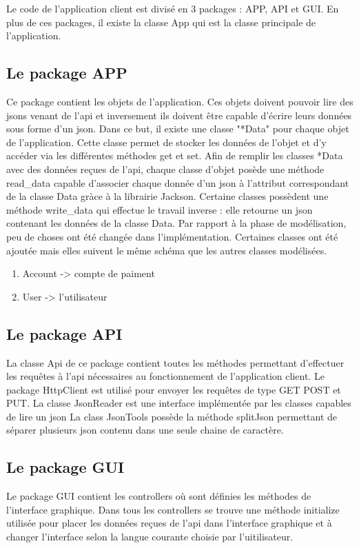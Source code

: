 \documentclass[../rapport.tex]{subfiles}
\begin{document}
Le code de l'application client est divisé en 3 packages : APP, API et GUI.
En plus de ces packages, il existe la classe App qui est la classe principale de l'application. 

\subsection{Le package APP}
Ce package contient les objets de l'application. Ces objets doivent pouvoir lire des jsons venant de l'api et inversement ils doivent être capable
d'écrire leurs données sous forme d'un json. Dans ce but, il existe une classe "*Data" pour chaque objet de l'application. Cette classe permet de stocker 
les données de l'objet et d'y accéder via les différentes méthodes get et set. 
Afin de remplir les classes *Data avec des données reçues de l'api, chaque classe d'objet posède une méthode read_data capable d'associer
chaque donnée d'un json à l'attribut correspondant de la classe Data gràce à la librairie Jackson.  
Certaine classes possèdent une méthode write_data qui effectue le travail inverse : elle retourne un json contenant les données de la classe Data.
Par rapport à la phase de modélisation, peu de choses ont été changée dans l'implémentation. Certaines classes ont été ajoutée mais elles suivent le même schéma que 
les autres classes modélisées.

\begin{enumerate}
\item Account -> compte de paiment
\item User -> l'utilisateur
\end{enumerate}

\subsection{Le package API}
La classe Api de ce package contient toutes les méthodes permettant d'effectuer les requêtes à l'api nécessaires au fonctionnement de l'application client.
Le package HttpClient est utilisé pour envoyer les requêtes de type GET POST et PUT.
La classe JsonReader est une interface implémentée par les classes capables de lire un json
La class JsonTools possède la méthode splitJson permettant de séparer plusieurs json contenu dans une seule chaine de caractère.

\subsection{Le package GUI}
Le package GUI contient les controllers où sont définies les méthodes de l'interface graphique. 
Dans tous les controllers se trouve une méthode initialize utilisée pour placer les données reçues de l'api dans l'interface graphique et à changer l'interface
selon la langue courante choisie par l'uitilisateur.
\end{document}
